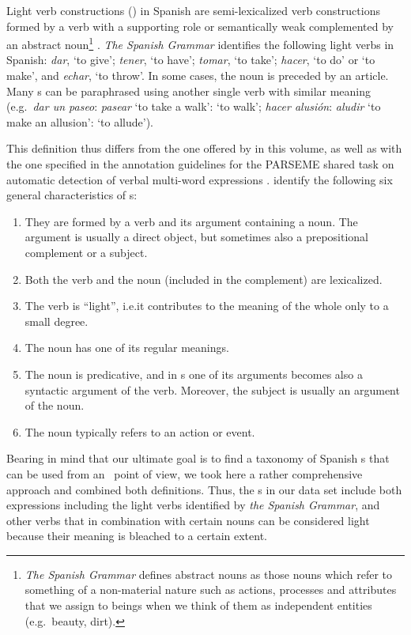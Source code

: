 \documentclass[output=paper]{langsci/langscibook}
\begin{document}
Light verb constructions (\lvc) in Spanish are semi-lexicalized verb constructions formed by a verb with a supporting role or semantically weak complemented by an abstract noun\footnote{\textit{The Spanish Grammar} \citeyearpar[210]{RAE:2010} defines abstract nouns as those nouns which refer to something of a non-material nature such as actions, processes and attributes that we assign to beings when we think of them as independent entities (e.g.\ beauty, dirt).} \citep[14]{RAE:2010}.
\textit{The Spanish Grammar} \citep[14]{RAE:2010} identifies the following light verbs in Spanish: \textit{dar}, `to give'; \textit{tener}, `to have'; \textit{tomar}, `to take'; \textit{hacer}, `to do' or `to make', and \textit{echar}, `to throw'. 
In some cases, the noun is preceded by an article.
Many \lvc s can be paraphrased using another single verb with similar meaning (e.g.\ \textit{dar un paseo}: \textit{pasear} `to take a walk': `to walk'; \textit{hacer alusión}: \textit{aludir} `to make an allusion': `to allude').

This definition thus differs from the one offered by \citet{Laporte:2016} in this volume, as well as with the one specified in the annotation guidelines for the PARSEME shared task on automatic detection of verbal multi-word expressions \citep{Vincze:2016}.
\cite{Vincze:2016} identify the following six general characteristics of \lvc s:

\begin{enumerate}
\item They are formed by a verb and its argument containing a noun. The argument is usually a direct object, but sometimes also a prepositional complement or a subject.
\item Both the verb and the noun (included in the complement) are lexicalized.
\item The verb is ``light'', i.e.\@ it contributes to the meaning of the whole only to a small degree.
\item The noun has one of its regular meanings.
\item The noun is predicative, and in \lvc s one of its arguments becomes also a syntactic argument of the verb. Moreover, the subject is usually an argument of the noun.
\item The noun typically refers to an action or event.
\end{enumerate}

Bearing in mind that our ultimate goal is to find a taxonomy of Spanish \mwe s that can be used from an \nlp\ point of view, we took here a rather comprehensive approach and combined both definitions.
Thus, the \lvc s in our data set include both expressions including the light verbs identified by \textit{the Spanish Grammar}, and other verbs that in combination with certain nouns can be considered light because their meaning is bleached to a certain extent.
\end{document}
